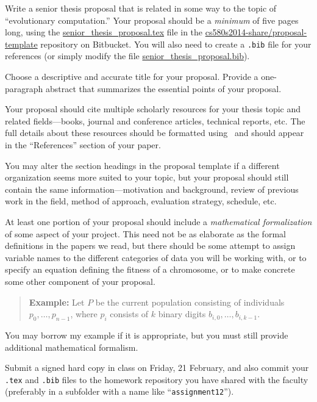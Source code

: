 
\usepackage{ulem}
\usepackage[compact]{titlesec}




Write a senior thesis proposal that is related in some way to the topic of
``evolutionary computation.'' Your proposal should be a {\em minimum} of 
five pages long, using the \url{senior_thesis_proposal.tex} file in 
the \url{cs580s2014-share/proposal-template} repository on Bitbucket.
You will also need to create a {\tt .bib} file for your references (or
simply modify the file \url{senior_thesis_proposal.bib}).

Choose a descriptive and accurate title for your proposal. Provide a
one-paragraph abstract that summarizes the essential points of your proposal.

Your proposal should cite multiple scholarly resources for your thesis topic and
related fields---books, journal and conference articles, 
technical reports, etc. The full details about these resources should be 
formatted using \BibTeX\ and should appear 
in the ``References'' section of your paper.

You may alter the section headings in the proposal template if a
different organization seems more suited to your topic, but your proposal
should still contain the same information---motivation and background, 
review of previous work in the field, method of approach, evaluation strategy,
schedule, etc.

At least one portion of your proposal should include a {\em mathematical
formalization} of some  aspect of your project. This need not be as
elaborate as the formal definitions in the papers we read, but there
should be some attempt to assign variable names to the different categories
of data you will be working with, or to specify
an equation defining the fitness of a chromosome, or to make
concrete some other component of your proposal.
\begin{quote}
{\bf Example:} Let $P$ be the current population consisting of individuals
$p_0, \ldots, p_{n-1}$, where $p_i$ consists of $k$ binary digits
$b_{i,0}, \ldots, b_{i,k-1}$.
\end{quote}
You may borrow my example if it is appropriate, but you must still provide
additional mathematical formalism.

Submit a signed hard copy in class on Friday, 21 February, and
also commit your {\tt .tex} and {\tt .bib} files to the homework
repository you have shared with the faculty (preferably in a subfolder 
with a name like ``{\tt assignment12}'').

